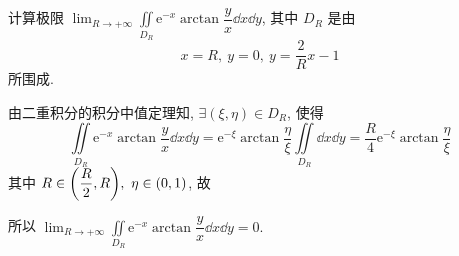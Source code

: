 \begin{example}
    计算极限 $\displaystyle\lim_{R\to+\infty}\iint\limits_{D_R}\mathrm{e}^{-x}\arctan\dfrac{y}{x}\dd x\dd y$, 其中 $D_R$ 是由 $$x=R,~y=0,~y=\dfrac{2}{R}x-1$$ 所围成.
\end{example}
\begin{solution}
    由二重积分的积分中值定理知, $\exists(\xi,\eta)\in D_R$,
    使得 $$\iint\limits_{D_R}\mathrm{e}^{-x}\arctan\dfrac{y}{x}\dd x\dd y=\mathrm{e}^{-\xi}\arctan\dfrac{\eta}{\xi}\iint\limits_{D_R}\dd x\dd y=\dfrac{R}{4}\mathrm{e}^{-\xi}\arctan\dfrac{\eta}{\xi}$$
    其中 $R\in\qty(\dfrac{R}{2},R),~\eta\in(0,1)$, 故 
    所以 $\displaystyle\lim_{R\to+\infty}\iint\limits_{D_R}\mathrm{e}^{-x}\arctan\dfrac{y}{x}\dd x\dd y=0.$
\end{solution}

